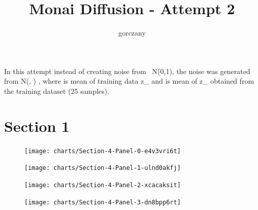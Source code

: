 \documentclass{article}
\title{Monai Diffusion - Attempt 2}
\author{%
gorczany
}
\begin{document}
\maketitle

In this attempt instead of creating noise from ~N(0,1), the noise was generated from N(\mu, \sigma)  , where \mu   is mean of training data z_{\mu} and \sigma is mean of z_{\sigma} obtained from the training dataset (25 samples).
\section{Section 1}

\begin{figure}[!htb]
\texttt{[image: charts/Section-4-Panel-0-e4v3vri6t]}
\caption{}
\endminipage\hfill
{}
\texttt{[image: charts/Section-4-Panel-1-ulnd0akfj]}
\caption{}
\endminipage
\end{figure}

\begin{figure}[!htb]
\texttt{[image: charts/Section-4-Panel-2-xcacaksit]}
\caption{}
\endminipage\hfill
{}
\texttt{[image: charts/Section-4-Panel-3-dn8bpp6rt]}
\caption{}
\endminipage
\end{figure}
\end{document}
